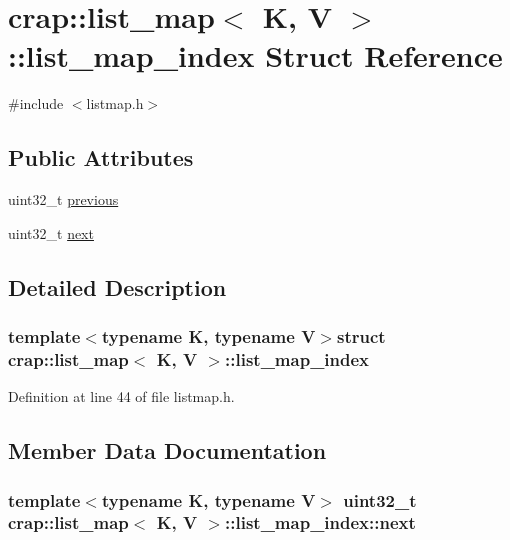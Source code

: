 \hypertarget{structcrap_1_1list__map_1_1list__map__index}{\section{crap\+:\+:list\+\_\+map$<$ K, V $>$\+:\+:list\+\_\+map\+\_\+index Struct Reference}
\label{structcrap_1_1list__map_1_1list__map__index}
}


{\ttfamily \#include $<$listmap.\+h$>$}

\subsection*{Public Attributes}
\begin{DoxyCompactItemize}
\item 
uint32\+\_\+t \hyperlink{structcrap_1_1list__map_1_1list__map__index_a8e8b7713b93e3733e4663c46e26661ac}{previous}
\item 
uint32\+\_\+t \hyperlink{structcrap_1_1list__map_1_1list__map__index_a020ab02040190f18d576bd851dd7ed11}{next}
\end{DoxyCompactItemize}


\subsection{Detailed Description}
\subsubsection*{template$<$typename K, typename V$>$struct crap\+::list\+\_\+map$<$ K, V $>$\+::list\+\_\+map\+\_\+index}



Definition at line 44 of file listmap.\+h.



\subsection{Member Data Documentation}
\hypertarget{structcrap_1_1list__map_1_1list__map__index_a020ab02040190f18d576bd851dd7ed11}{
\subsubsection[{next}]{\setlength{\rightskip}{0pt plus 5cm}template$<$typename K, typename V$>$ uint32\+\_\+t {\bf crap\+::list\+\_\+map}$<$ K, V $>$\+::list\+\_\+map\+\_\+index\+::next}}\label{structcrap_1_1list__map_1_1list__map__index_a020ab02040190f18d576bd851dd7ed11}


